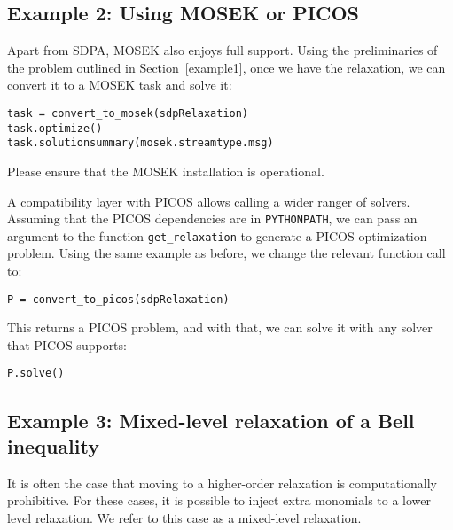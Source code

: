 \documentclass{article}
\begin{document}
\subsection{Example 2: Using MOSEK or PICOS}
Apart from SDPA, MOSEK also enjoys full support. Using the preliminaries of the problem outlined in Section~\ref{example1}, once we have the relaxation, we can convert it to a MOSEK task and solve it:

\begin{verbatim}
task = convert_to_mosek(sdpRelaxation)
task.optimize()
task.solutionsummary(mosek.streamtype.msg)
\end{verbatim}
Please ensure that the MOSEK installation is operational.

A compatibility layer with PICOS allows calling a wider ranger of solvers. Assuming that the PICOS dependencies are in \verb+PYTHONPATH+, we can pass an argument to the function \verb+get_relaxation+ to generate a PICOS optimization problem. Using the same example as before, we change the relevant function call to:
\begin{verbatim}
P = convert_to_picos(sdpRelaxation)
\end{verbatim}
This returns a PICOS problem, and with that, we can solve it with any solver that PICOS supports:
\begin{verbatim}
P.solve()
\end{verbatim}

\subsection{Example 3: Mixed-level relaxation of a Bell inequality}\label{mixedlevel}
It is often the case that moving to a higher-order relaxation is computationally prohibitive. For these cases, it is possible to inject extra monomials to a lower level relaxation. We refer to this case as a mixed-level relaxation.
\end{document}
